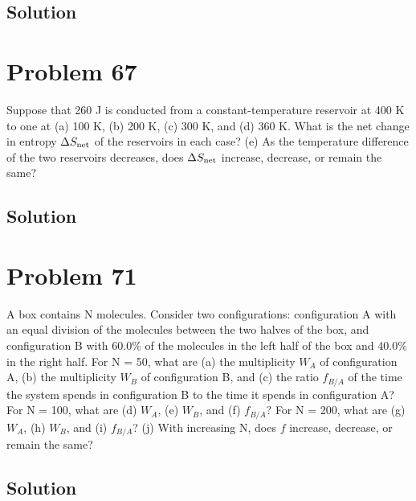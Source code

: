 \documentclass[12pt]{article}
\begin{document}
        \subsection{Solution}

    \section{Problem 67}
        Suppose that 260 J is conducted from a constant-temperature reservoir at 400 K to one at (a) 100 K, (b) 200 K, (c) 300 K, and (d) 360 K. 
        What is the net change in entropy $\Delta S_{\rm net}$ of the reservoirs in each case? 
        (e) As the temperature difference of the two reservoirs decreases, does $\Delta S_{\rm net}$ increase, decrease, or remain the same?

        \subsection{Solution}

    \section{Problem 71}
        A box contains N molecules. 
        Consider two configurations: configuration A with an equal division of the molecules between the two halves of the box, and configuration B with 60.0\% of the molecules in the left half of the box and 40.0\% in the right half. 
        For N = 50, what are (a) the multiplicity $W_A$ of configuration A, (b) the multiplicity $W_B$ of configuration B, and (c) the ratio $f_{B/A}$ of the time the system spends in configuration B to the time it spends in configuration A? 
        For N = 100, what are (d) $W_A$, (e) $W_B$, and (f) $f_{B/A}$? 
        For N = 200, what are (g) $W_A$, (h) $W_B$, and (i) $f_{B/A}$? 
        (j) With increasing N, does $f$ increase, decrease, or remain the same?

        \subsection{Solution}

    \pagebreak

    \tableofcontents
\end{document}
